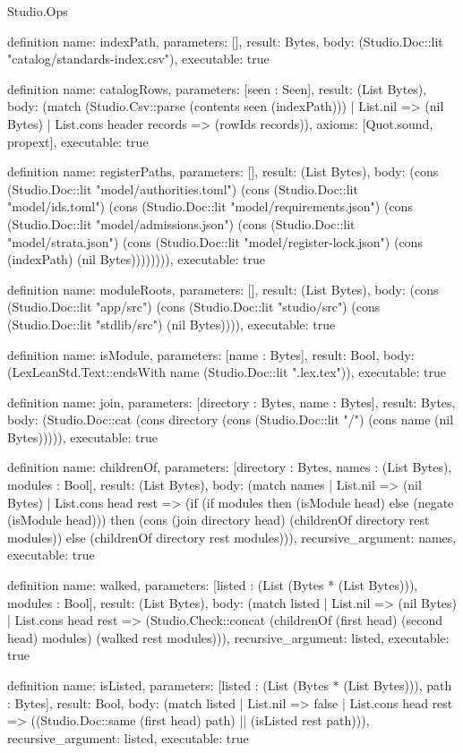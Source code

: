 \begin{lexlean}{Studio.Ops}
\begin{semanticmodule}
definition{
  name: indexPath,
  parameters: [],
  result: Bytes,
  body: (Studio.Doc::lit "catalog/standards-index.csv"),
  executable: true
}


definition{
  name: catalogRows,
  parameters: [seen : Seen],
  result: (List Bytes),
  body: (match (Studio.Csv::parse (contents seen (indexPath)))
    | List.nil => (nil Bytes)
    | List.cons header records => (rowIds records)),
  axioms: [Quot.sound, propext],
  executable: true
}


definition{
  name: registerPaths,
  parameters: [],
  result: (List Bytes),
  body: (cons (Studio.Doc::lit "model/authorities.toml") (cons (Studio.Doc::lit "model/ids.toml") (cons (Studio.Doc::lit "model/requirements.json") (cons (Studio.Doc::lit "model/admissions.json") (cons (Studio.Doc::lit "model/strata.json") (cons (Studio.Doc::lit "model/register-lock.json") (cons (indexPath) (nil Bytes)))))))),
  executable: true
}


definition{
  name: moduleRoots,
  parameters: [],
  result: (List Bytes),
  body: (cons (Studio.Doc::lit "app/src") (cons (Studio.Doc::lit "studio/src") (cons (Studio.Doc::lit "stdlib/src") (nil Bytes)))),
  executable: true
}


definition{
  name: isModule,
  parameters: [name : Bytes],
  result: Bool,
  body: (LexLeanStd.Text::endsWith name (Studio.Doc::lit ".lex.tex")),
  executable: true
}


definition{
  name: join,
  parameters: [directory : Bytes, name : Bytes],
  result: Bytes,
  body: (Studio.Doc::cat (cons directory (cons (Studio.Doc::lit "/") (cons name (nil Bytes))))),
  executable: true
}


definition{
  name: childrenOf,
  parameters: [directory : Bytes, names : (List Bytes), modules : Bool],
  result: (List Bytes),
  body: (match names
    | List.nil => (nil Bytes)
    | List.cons head rest => (if (if modules then (isModule head) else (negate (isModule head))) then (cons (join directory head) (childrenOf directory rest modules)) else (childrenOf directory rest modules))),
  recursive_argument: names,
  executable: true
}


definition{
  name: walked,
  parameters: [listed : (List (Bytes * (List Bytes))), modules : Bool],
  result: (List Bytes),
  body: (match listed
    | List.nil => (nil Bytes)
    | List.cons head rest => (Studio.Check::concat (childrenOf (first head) (second head) modules) (walked rest modules))),
  recursive_argument: listed,
  executable: true
}


definition{
  name: isListed,
  parameters: [listed : (List (Bytes * (List Bytes))), path : Bytes],
  result: Bool,
  body: (match listed
    | List.nil => false
    | List.cons head rest => ((Studio.Doc::same (first head) path) || (isListed rest path))),
  recursive_argument: listed,
  executable: true
}



\end{semanticmodule}
\end{lexlean}
